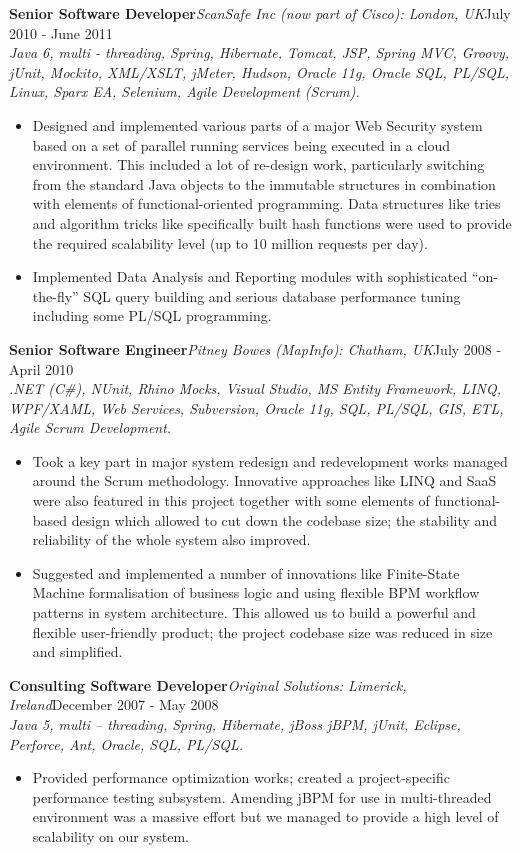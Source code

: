 \documentclass{res}
\newcommand{\jobdes}[4]{\needspace{3\baselineskip}%
{\noindent \bf #3\hspace{2ex}}{{\em \small #1}}{\hfill #2}\\{{\em \small #4.}}}
\begin{document}
\begin{resume}
\jobdes{ScanSafe Inc (now part of Cisco): London, UK}{July 2010 - June 2011}{Senior Software Developer}
{Java 6, multi - threading, Spring, Hibernate, Tomcat, JSP, Spring MVC, Groovy, jUnit, Mockito, XML/XSLT, jMeter, Hudson, Oracle 11g, Oracle SQL, PL/SQL, Linux, Sparx EA, Selenium, Agile Development (Scrum)}
\begin{itemize} \itemsep -2pt %
 \item Designed and implemented various parts of a major Web Security system based on a set of parallel running services being executed in a cloud environment. This included a lot of re-design work, particularly switching from the standard Java objects to the immutable structures in combination with elements of functional-oriented programming. Data structures like tries and algorithm tricks like specifically built hash functions were used to provide the required scalability level (up to 10 million requests per day).
 \item Implemented Data Analysis and Reporting modules with sophisticated “on-the-fly” SQL query building and serious database performance tuning including some PL/SQL programming.
\end{itemize}

\jobdes{Pitney Bowes (MapInfo): Chatham, UK}{July 2008 - April 2010}{Senior Software Engineer}
{.NET (C\#), NUnit, Rhino Mocks, Visual Studio, MS Entity Framework, LINQ, WPF/XAML, Web Services, Subversion, Oracle 11g, SQL, PL/SQL, GIS, ETL, Agile Scrum Development}
\begin{itemize} \itemsep -2pt %
 \item Took a key part in major system redesign and redevelopment works managed around the Scrum methodology. Innovative approaches like LINQ and SaaS were also featured in this project together with some elements of functional-based design which allowed to cut down the codebase size; the stability and reliability of the whole system also improved.
 \item Suggested and implemented a number of innovations like Finite-State Machine formalisation of business logic and using flexible BPM workflow patterns in system architecture. This allowed us to build a powerful and flexible user-friendly product; the project codebase size was reduced in size and simplified.
\end{itemize}

\jobdes {Original Solutions: Limerick, Ireland}{December 2007 - May 2008}{Consulting Software Developer}
{Java 5, multi – threading, Spring, Hibernate, jBoss jBPM, jUnit, Eclipse, Perforce, Ant, Oracle, SQL, PL/SQL}
\begin{itemize} \itemsep -2pt %
 \item Provided performance optimization works; created a project-specific performance testing subsystem. Amending jBPM for use in multi-threaded environment was a massive effort but we managed to provide a high level of scalability on our system.
\end{itemize}


\end{resume}
\end{document}
